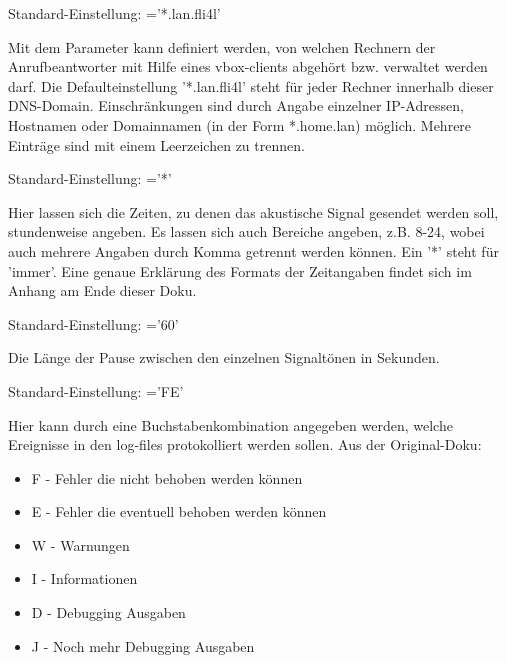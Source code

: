\begin{description}
    Standard-Einstellung: ='*.lan.fli4l'
    
    Mit dem  Parameter kann definiert werden, von welchen Rechnern 
    der Anrufbeantworter mit Hilfe eines vbox-clients abgehört bzw. verwaltet werden darf. 
    Die Defaulteinstellung '*.lan.fli4l' steht für jeder Rechner innerhalb dieser DNS-Domain. 
    Einschränkungen sind durch Angabe einzelner IP-Adressen, Hostnamen oder Domainnamen 
    (in der Form *.home.lan) möglich. Mehrere Einträge sind mit einem Leerzeichen zu trennen.
    



    Standard-Einstellung: ='*'
    
    Hier lassen sich die Zeiten, zu denen das akustische Signal gesendet werden soll, 
    stundenweise angeben. Es lassen sich auch Bereiche angeben, z.B. 8-24, wobei auch mehrere 
    Angaben durch Komma getrennt werden können. Ein '*' steht für 'immer'. Eine genaue 
    Erklärung des Formats der Zeitangaben findet sich im Anhang am Ende dieser Doku.
    


    Standard-Einstellung: ='60'
    
    Die Länge der Pause zwischen den einzelnen Signaltönen in Sekunden.


    Standard-Einstellung: ='FE'

    Hier kann durch eine Buchstabenkombination angegeben werden, welche Ereignisse in 
    den log-files protokolliert werden sollen. Aus der Original-Doku:
    \begin{itemize}
        \item F - Fehler die nicht behoben werden können
        \item E - Fehler die eventuell behoben werden können
        \item W - Warnungen
        \item I - Informationen
        \item D - Debugging Ausgaben
        \item J - Noch mehr Debugging Ausgaben
    \end{itemize}


\end{description}
